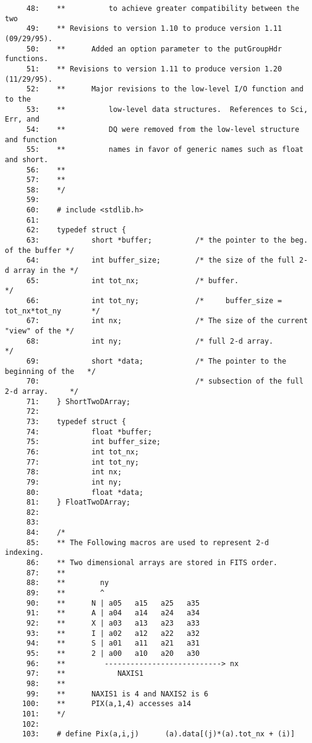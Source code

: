\begin{scriptsize}
\begin{verbatim}
     48:    **          to achieve greater compatibility between the two
     49:    ** Revisions to version 1.10 to produce version 1.11 (09/29/95).
     50:    **      Added an option parameter to the putGroupHdr functions.
     51:    ** Revisions to version 1.11 to produce version 1.20 (11/29/95).
     52:    **      Major revisions to the low-level I/O function and to the
     53:    **          low-level data structures.  References to Sci, Err, and
     54:    **          DQ were removed from the low-level structure and function
     55:    **          names in favor of generic names such as float and short.
     56:    **      
     57:    **      
     58:    */
     59:    
     60:    # include <stdlib.h>
     61:    
     62:    typedef struct {
     63:            short *buffer;          /* the pointer to the beg. of the buffer */
     64:            int buffer_size;        /* the size of the full 2-d array in the */
     65:            int tot_nx;             /* buffer.                               */
     66:            int tot_ny;             /*     buffer_size = tot_nx*tot_ny       */
     67:            int nx;                 /* The size of the current "view" of the */
     68:            int ny;                 /* full 2-d array.                       */
     69:            short *data;            /* The pointer to the beginning of the   */
     70:                                    /* subsection of the full 2-d array.     */
     71:    } ShortTwoDArray;
     72:    
     73:    typedef struct {
     74:            float *buffer;
     75:            int buffer_size;
     76:            int tot_nx;
     77:            int tot_ny;
     78:            int nx;
     79:            int ny;
     80:            float *data;
     81:    } FloatTwoDArray;
     82:    
     83:    
     84:    /* 
     85:    ** The Following macros are used to represent 2-d indexing.  
     86:    ** Two dimensional arrays are stored in FITS order.
     87:    **
     88:    **        ny
     89:    **        ^
     90:    **      N | a05   a15   a25   a35
     91:    **      A | a04   a14   a24   a34
     92:    **      X | a03   a13   a23   a33
     93:    **      I | a02   a12   a22   a32
     94:    **      S | a01   a11   a21   a31
     95:    **      2 | a00   a10   a20   a30
     96:    **         ---------------------------> nx
     97:    **            NAXIS1
     98:    **
     99:    **      NAXIS1 is 4 and NAXIS2 is 6
    100:    **      PIX(a,1,4) accesses a14
    101:    */
    102:    
    103:    # define Pix(a,i,j)      (a).data[(j)*(a).tot_nx + (i)]

\end{verbatim}
\end{scriptsize}
